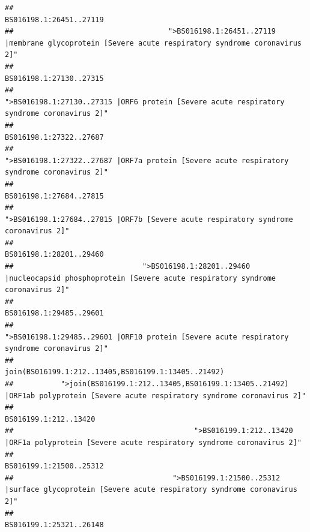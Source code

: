 \documentclass[
]{article}
\begin{document}
\begin{verbatim}
##                                                                                                                BS016198.1:26451..27119 
##                                    ">BS016198.1:26451..27119 |membrane glycoprotein [Severe acute respiratory syndrome coronavirus 2]" 
##                                                                                                                BS016198.1:27130..27315 
##                                             ">BS016198.1:27130..27315 |ORF6 protein [Severe acute respiratory syndrome coronavirus 2]" 
##                                                                                                                BS016198.1:27322..27687 
##                                            ">BS016198.1:27322..27687 |ORF7a protein [Severe acute respiratory syndrome coronavirus 2]" 
##                                                                                                                BS016198.1:27684..27815 
##                                                    ">BS016198.1:27684..27815 |ORF7b [Severe acute respiratory syndrome coronavirus 2]" 
##                                                                                                                BS016198.1:28201..29460 
##                              ">BS016198.1:28201..29460 |nucleocapsid phosphoprotein [Severe acute respiratory syndrome coronavirus 2]" 
##                                                                                                                BS016198.1:29485..29601 
##                                            ">BS016198.1:29485..29601 |ORF10 protein [Severe acute respiratory syndrome coronavirus 2]" 
##                                                                                    join(BS016199.1:212..13405,BS016199.1:13405..21492) 
##           ">join(BS016199.1:212..13405,BS016199.1:13405..21492) |ORF1ab polyprotein [Severe acute respiratory syndrome coronavirus 2]" 
##                                                                                                                  BS016199.1:212..13420 
##                                          ">BS016199.1:212..13420 |ORF1a polyprotein [Severe acute respiratory syndrome coronavirus 2]" 
##                                                                                                                BS016199.1:21500..25312 
##                                     ">BS016199.1:21500..25312 |surface glycoprotein [Severe acute respiratory syndrome coronavirus 2]" 
##                                                                                                                BS016199.1:25321..26148 

\end{verbatim}
\end{document}

